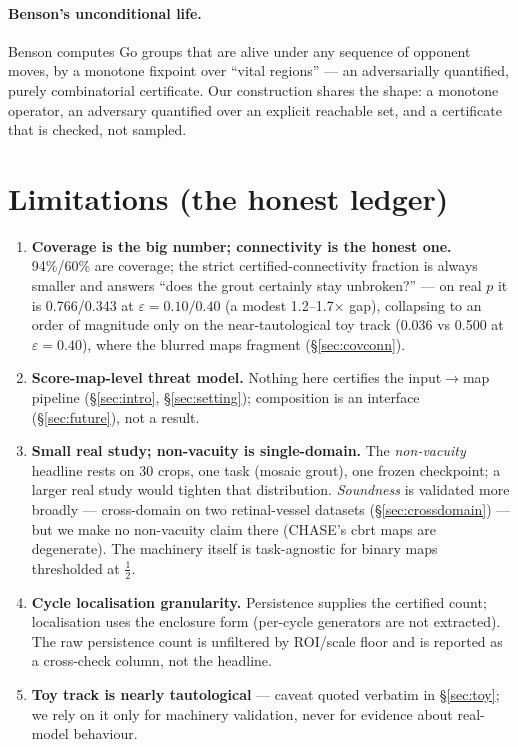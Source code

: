 \documentclass[10pt]{article}
\newcommand{\eps}{\varepsilon}
\begin{document}
\paragraph{Benson's unconditional life.} Benson \citep{benson1976}
computes Go groups that are alive under any sequence of opponent moves, by
a monotone fixpoint over ``vital regions'' --- an adversarially
quantified, purely combinatorial certificate. Our construction shares the
shape: a monotone operator, an adversary quantified over an explicit
reachable set, and a certificate that is checked, not sampled.

\section{Limitations (the honest ledger)}\label{sec:limitations}

\begin{enumerate}
\item \textbf{Coverage is the big number; connectivity is the honest
  one.} 94\%/60\% are coverage; the strict certified-connectivity
  fraction is always smaller and answers ``does the grout certainly stay
  unbroken?'' --- on real $p$ it is 0.766/0.343 at $\eps=0.10/0.40$ (a
  modest 1.2--1.7$\times$ gap), collapsing to an order of magnitude only
  on the near-tautological toy track (0.036 vs 0.500 at $\eps=0.40$),
  where the blurred maps fragment (\S\ref{sec:covconn}).
\item \textbf{Score-map-level threat model.} Nothing here certifies the
  input$\to$map pipeline (\S\ref{sec:intro}, \S\ref{sec:setting});
  composition is an interface (\S\ref{sec:future}), not a result.
\item \textbf{Small real study; non-vacuity is single-domain.} The
  \emph{non-vacuity} headline rests on 30 crops, one task (mosaic grout),
  one frozen checkpoint; a larger real study would tighten that
  distribution. \emph{Soundness} is validated more broadly --- cross-domain
  on two retinal-vessel datasets (\S\ref{sec:crossdomain}) --- but we make
  no non-vacuity claim there (CHASE's cbrt maps are degenerate). The
  machinery itself is task-agnostic for binary maps thresholded at
  $\tfrac12$.
\item \textbf{Cycle localisation granularity.} Persistence supplies the
  certified count; localisation uses the enclosure form (per-cycle
  generators are not extracted). The raw persistence count is unfiltered
  by ROI/scale floor and is reported as a cross-check column, not the
  headline.
\item \textbf{Toy track is nearly tautological} --- caveat quoted verbatim
  in \S\ref{sec:toy}; we rely on it only for machinery validation, never
  for evidence about real-model behaviour.
\end{enumerate}
\end{document}
